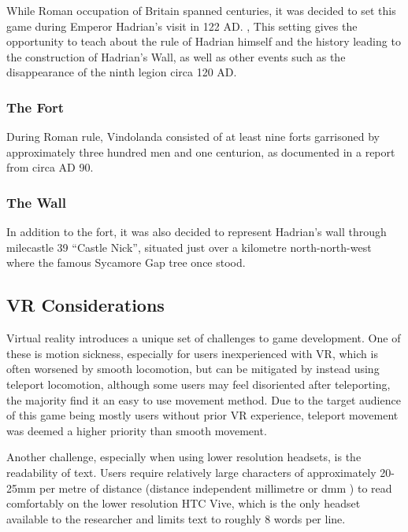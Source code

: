 \documentclass[sigconf,authordraft]{acmart}
\begin{document}
While Roman occupation of Britain spanned centuries, it was decided to set this
game during Emperor Hadrian's visit in 122 AD.
\cite[p.176]{danziger_hadrians_2006}, \cite[p.157]{moffat_wall_2009}
This setting gives the opportunity to teach about the rule of Hadrian himself
and the history leading to the construction of Hadrian's Wall, as well as other
events such as the disappearance of the ninth legion circa 120 AD.


\subsubsection{The Fort}

During Roman rule, Vindolanda consisted of at least nine forts
\cite{birley_vindolanda_2009} garrisoned by approximately three hundred men and
one centurion, as documented in a report from circa AD 90.
\cite{bowman_military_1991}

\subsubsection{The Wall}

In addition to the fort, it was also decided to represent Hadrian's wall through
milecastle 39 ``Castle Nick'', situated just over a kilometre north-north-west
where the famous Sycamore Gap tree once stood.

\subsection{VR Considerations}
Virtual reality introduces a unique set of challenges to game development. One
of these is motion sickness, especially for users inexperienced with VR,
\cite{chattha_motion_2020} which is often worsened by smooth locomotion, but can
be mitigated by instead using teleport locomotion, although some users may feel
disoriented after teleporting, the majority find it an easy to use movement
method. \cite{bozgeyikli_point_2016} Due to the target audience of this game
being mostly users without prior VR experience, teleport movement was deemed a
higher priority than smooth movement.

\label{sec:text_scale}
Another challenge, especially when using lower resolution headsets, is the
readability of text. Users require relatively large characters of approximately
20-25mm per metre of distance (distance independent millimetre or dmm
\cite{google_for_developers_designing_2017}) to read comfortably on the lower
resolution HTC Vive, \cite{solum_readability_2019} which is the only headset
available to the researcher and limits text to roughly 8 words per line.
\end{document}
